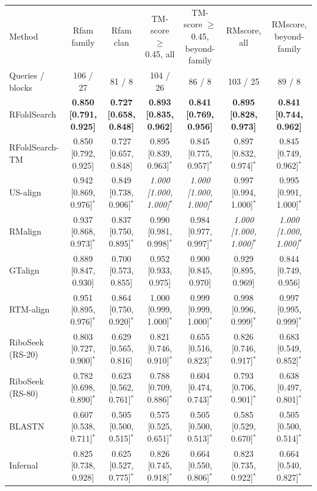 \begin{tabular}{lcccccc}
\toprule
Method & Rfam family & Rfam clan & TM-score $\geq$ 0.45, all & TM-score $\geq$ 0.45, beyond-family & RMscore, all & RMscore, beyond-family \\
Queries / blocks & 106 / 27 & 81 / 8 & 104 / 26 & 86 / 8 & 103 / 25 & 89 / 8 \\
\midrule
RFoldSearch & \textbf{0.850 [0.791, 0.925]} & \textbf{0.727 [0.658, 0.848]} & \textbf{0.893 [0.835, 0.962]} & \textbf{0.841 [0.769, 0.956]} & \textbf{0.895 [0.828, 0.973]} & \textbf{0.841 [0.744, 0.962]} \\
RFoldSearch-TM & 0.850 [0.792, 0.925] & 0.727 [0.657, 0.848] & 0.895 [0.839, 0.963]$^{*}$ & 0.845 [0.775, 0.957]$^{*}$ & 0.897 [0.832, 0.974]$^{*}$ & 0.845 [0.749, 0.962]$^{*}$ \\
US-align & 0.942 [0.869, 0.976]$^{*}$ & 0.849 [0.738, 0.906]$^{*}$ & \textit{1.000 [1.000, 1.000]$^{*}$} & \textit{1.000 [1.000, 1.000]$^{*}$} & 0.997 [0.994, 1.000]$^{*}$ & 0.995 [0.991, 1.000]$^{*}$ \\
RMalign & 0.937 [0.868, 0.973]$^{*}$ & 0.837 [0.750, 0.895]$^{*}$ & 0.990 [0.981, 0.998]$^{*}$ & 0.984 [0.977, 0.997]$^{*}$ & \textit{1.000 [1.000, 1.000]$^{*}$} & \textit{1.000 [1.000, 1.000]$^{*}$} \\
GTalign & 0.889 [0.847, 0.930] & 0.700 [0.573, 0.855] & 0.952 [0.933, 0.975] & 0.900 [0.845, 0.970] & 0.929 [0.895, 0.969] & 0.844 [0.749, 0.956] \\
RTM-align & 0.951 [0.895, 0.976]$^{*}$ & 0.864 [0.750, 0.920]$^{*}$ & 1.000 [0.999, 1.000]$^{*}$ & 0.999 [0.999, 1.000]$^{*}$ & 0.998 [0.996, 0.999]$^{*}$ & 0.997 [0.995, 0.999]$^{*}$ \\
RiboSeek (RS-20) & 0.803 [0.727, 0.900]$^{*}$ & 0.629 [0.565, 0.816] & 0.821 [0.746, 0.910]$^{*}$ & 0.655 [0.516, 0.823]$^{*}$ & 0.826 [0.746, 0.917]$^{*}$ & 0.683 [0.549, 0.852]$^{*}$ \\
RiboSeek (RS-80) & 0.782 [0.698, 0.890]$^{*}$ & 0.623 [0.562, 0.761]$^{*}$ & 0.788 [0.709, 0.886]$^{*}$ & 0.604 [0.474, 0.743]$^{*}$ & 0.793 [0.706, 0.901]$^{*}$ & 0.638 [0.497, 0.801]$^{*}$ \\
BLASTN & 0.607 [0.538, 0.711]$^{*}$ & 0.505 [0.500, 0.515]$^{*}$ & 0.575 [0.525, 0.651]$^{*}$ & 0.505 [0.500, 0.513]$^{*}$ & 0.585 [0.529, 0.670]$^{*}$ & 0.505 [0.500, 0.514]$^{*}$ \\
Infernal & 0.825 [0.738, 0.928] & 0.625 [0.527, 0.775]$^{*}$ & 0.826 [0.745, 0.918]$^{*}$ & 0.664 [0.550, 0.806]$^{*}$ & 0.823 [0.735, 0.922]$^{*}$ & 0.664 [0.540, 0.827]$^{*}$ \\
\bottomrule
\end{tabular}
